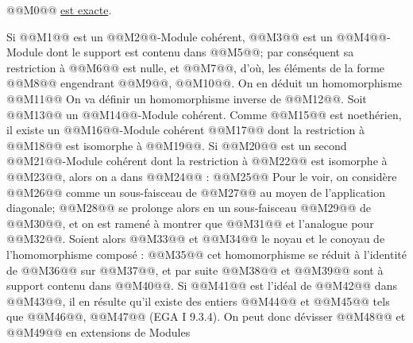 
@@M0@@
\uline{est
exacte}.

Si @@M1@@ est un @@M2@@-Module cohérent, @@M3@@ est un @@M4@@-Module dont le support est contenu dans @@M5@@; par conséquent sa restriction à @@M6@@ est nulle, et @@M7@@, d'où, les éléments de la forme @@M8@@ engendrant @@M9@@, @@M10@@. On en déduit un homomorphisme
@@M11@@
On va définir un homomorphisme inverse de @@M12@@. Soit @@M13@@ un @@M14@@-Module cohérent. Comme @@M15@@ est noethérien, il existe un @@M16@@-Module cohérent @@M17@@ dont la restriction à @@M18@@ est isomorphe à @@M19@@. Si @@M20@@ est un second @@M21@@-Module cohérent dont la restriction à @@M22@@ est isomorphe à @@M23@@, alors on a dans @@M24@@ :
@@M25@@
Pour le voir, on considère @@M26@@ comme un sous-faisceau de @@M27@@ au moyen de l'application diagonale; @@M28@@ se prolonge alors en un sous-faisceau @@M29@@ de @@M30@@, et on est ramené à montrer que
@@M31@@
et l'analogue pour @@M32@@. Soient alors @@M33@@ et @@M34@@ le noyau et le conoyau de l'homomorphisme composé :
@@M35@@
cet homomorphisme se réduit à l'identité de @@M36@@ sur @@M37@@, et par suite @@M38@@ et @@M39@@ sont à support contenu dans @@M40@@. Si @@M41@@ est l'idéal de @@M42@@ dans @@M43@@, il en résulte qu'il existe des entiers @@M44@@ et @@M45@@ tels que @@M46@@, @@M47@@ (EGA I 9.3.4). On peut donc dévisser @@M48@@ et @@M49@@ en extensions de Modules
